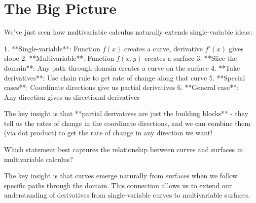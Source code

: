\documentclass{ximera}
\begin{document}
\section*{The Big Picture}

We've just seen how multivariable calculus naturally extends single-variable ideas:

1. **Single-variable**: Function $f(x)$ creates a curve, derivative $f'(x)$ gives slope
2. **Multivariable**: Function $f(x,y)$ creates a surface
3. **Slice the domain**: Any path through domain creates a curve on the surface  
4. **Take derivatives**: Use chain rule to get rate of change along that curve
5. **Special cases**: Coordinate directions give us partial derivatives
6. **General case**: Any direction gives us directional derivatives

The key insight is that **partial derivatives are just the building blocks** - they tell us the rates of change in the coordinate directions, and we can combine them (via dot product) to get the rate of change in any direction we want!

\begin{exercise}
Which statement best captures the relationship between curves and surfaces in multivariable calculus?

\begin{multipleChoice}
\end{multipleChoice}

\begin{feedback}
The key insight is that curves emerge naturally from surfaces when we follow specific paths through the domain. This connection allows us to extend our understanding of derivatives from single-variable curves to multivariable surfaces.
\end{feedback}
\end{exercise}
\end{document}
